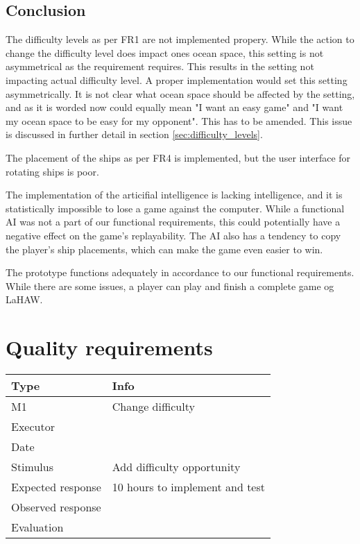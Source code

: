 \vspace{0.5em}


	\subsection{Conclusion}
	The difficulty levels as per FR1 are not implemented propery. While the action to change the difficulty level does impact ones ocean space, this setting is not asymmetrical as the requirement requires. This results in the setting not impacting actual difficulty level. A proper implementation would set this setting asymmetrically.
	It is not clear what ocean space should be affected by the setting, and as it is worded now could equally mean "I want an easy game" and "I want my ocean space to be easy for my opponent". This has to be amended. This issue is discussed in further detail in section \ref{sec:difficulty_levels}.

	The placement of the ships as per FR4 is implemented, but the user interface for rotating ships is poor.

	The implementation of the articifial intelligence is lacking intelligence, and it is statistically impossible to lose a game against the computer. While a functional AI was not a part of our functional requirements, this could potentially have a negative effect on the game's replayability. The AI also has a tendency to copy the player's ship placements, which can make the game even easier to win.

	The prototype functions adequately in accordance to our functional requirements. While there are some issues, a player can play and finish a complete game og LaHAW.



\section{Quality requirements}
\noindent
\begin{tabular}{|p{3cm}|p{8.5cm}|}
	\hline
	\bf{Type}	& \bf{Info} \\
	\hline
	M1			& Change difficulty \\
	Executor	&  \\
	Date		& \date{\today} \\
	Stimulus	& Add difficulty opportunity \\
	Expected response & 10 hours to implement and test \\
	Observed response & \\
	Evaluation	& \\
	\hline
\end{tabular}

